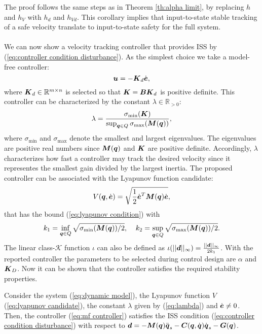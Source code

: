 The proof follows the same steps as in Theorem \ref{th:alpha limit}, by replacing $h$ and $h_V$ with $h_d$ and $h_{Vd}$. This corollary implies that input-to-state stable tracking of a safe velocity translate to input-to-state safety for the full system.\\
\\
We can now show a velocity tracking controller that provides ISS by (\ref{eq:controller condition disturbance}). As the simplest choice we take a model-free controller:
\begin{equation} \label{eq:mf controller}
    \boldsymbol{u} = -\boldsymbol{K}_d \dot{\boldsymbol{e}},
\end{equation}
where $\boldsymbol{K}_d \in \mathbb{R}^{m \times n}$ is selected so that $\boldsymbol{K}=\boldsymbol{B} \boldsymbol{K}_d$ is positive definite. This controller can be characterized by the constant $\lambda \in \mathbb{R}_{>0}$:
\begin{equation} \label{eq:lambda}
    \lambda = \frac{\sigma_{\min}(\boldsymbol{K})}{\sup_{{\boldsymbol{q}} \in Q} \sigma_{\max}(\boldsymbol{M}({\boldsymbol{q}}))},
\end{equation}
where $\sigma_{\min}$ and $\sigma_{\max}$ denote the smallest and largest eigenvalues. The eigenvalues are positive real numbers since $\boldsymbol{M}({\boldsymbol{q}})$ and $\boldsymbol{K}$ are positive definite. Accordingly, $\lambda$ characterizes how fast a controller may track the desired velocity since it representes the smallest gain divided by the largest inertia. The proposed controller can be associated with the Lyapunov function candidate:
\begin{equation} \label{eq:lyapunov candidate}
    V({\boldsymbol{q}},\dot{\boldsymbol{e}}) = \sqrt{\frac{1}{2} \dot{\boldsymbol{e}}^T \boldsymbol{M}({\boldsymbol{q}}) \dot{\boldsymbol{e}}},
\end{equation}
that has the bound (\ref{eq:lyapunov condition}) with 
\begin{equation} 
    k_1= \inf_{{\boldsymbol{q}} \in Q} \sqrt{\sigma_{\min} (\boldsymbol{M}({\boldsymbol{q}}))/2}, \;\;\;\; k_2= \sup_{{\boldsymbol{q}} \in Q} \sqrt{\sigma_{\max} (\boldsymbol{M}({\boldsymbol{q}}))/2}.
\end{equation}
The linear class-$\mathcal{K}$ function $\iota$ can also be defined as $\iota(||\boldsymbol{d}||_\infty)=\frac{||\boldsymbol{d}||_\infty}{2k_1}$. With the reported controller the parameters to be selected during control design are $\alpha$ and $\boldsymbol{K}_D$. Now it can be shown that the controller satisfies the required stability properties.
\begin{theorem}
    Consider the system (\ref{eq:dynamic model}), the Lyapunov function $V$ (\ref{eq:lyapunov candidate}), the constant $\lambda$ given by (\ref{eq:lambda}) and $\dot{\boldsymbol{e}} \neq 0$. Then, the controller (\ref{eq:mf controller}) satisfies the ISS condition (\ref{eq:controller condition disturbance}) with respect to $\boldsymbol{d} = -\boldsymbol{M}({\boldsymbol{q}})\ddot{{\boldsymbol{q}}}_s-\boldsymbol{C}({\boldsymbol{q}},\dot{{\boldsymbol{q}}})\dot{{\boldsymbol{q}}}_s-\boldsymbol{G}({\boldsymbol{q}})$.
\end{theorem}
